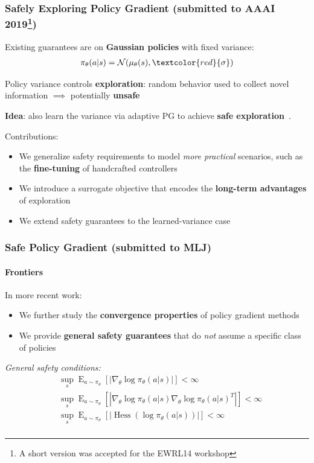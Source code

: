 \documentclass{beamer}
\begin{document}
\begin{frame}
\frametitle{Safely Exploring Policy Gradient \small(submitted to AAAI 2019\footnote{A short version was accepted for the EWRL14 workshop})}
Existing guarantees are on \textbf{Gaussian policies} with fixed variance:
\begin{align*}
	\pi_{\theta}(a \vert s) = \mathcal{N}(\mu_{\theta}(s), \textcolor{red}{\mathbf{\sigma}})
\end{align*}

Policy variance controls \textbf{exploration}: random behavior used to collect novel information $\implies$ potentially \textbf{unsafe}

\vfill

\textbf{Idea}: also learn the variance via adaptive PG to achieve \textbf{safe exploration}~\cite{amodei2016concrete}.

\vfill

\colorbox{cyan!10}{
\begin{minipage}{\textwidth}
Contributions:
\begin{itemize}
	\item We generalize safety requirements to model \textit{more practical} scenarios, such as the \textbf{fine-tuning} of handcrafted controllers
	\item We introduce a surrogate objective that encodes the \textbf{long-term advantages} of exploration
	\item We extend safety guarantees to the learned-variance case
\end{itemize}
\end{minipage}
}
\end{frame}


\begin{frame}
\frametitle{Safe Policy Gradient \small(submitted to MLJ)}
\framesubtitle{Frontiers}
\colorbox{cyan!10}{
	\begin{minipage}{\textwidth}
In more recent work:
\begin{itemize}
	\item We further study the \textbf{convergence properties} of policy gradient methods
	\item We provide \textbf{general safety guarantees} that do \textit{not} assume a specific class of policies
\end{itemize}
\end{minipage}
}

\vfill
	
\textit{General safety conditions:}
\begin{align*}
		&\sup_{s}\mathop{E}_{a\sim\pi_{\theta}}\left[\left|\nabla_{\theta}\log\pi_{\theta}(a\vert s)\right|\right] < \infty \\
		&\sup_{s}\mathop{E}_{a\sim\pi_{\theta}}\left[\left|\nabla_{\theta}\log\pi_{\theta}(a\vert s)\nabla_{\theta}\log\pi_{\theta}(a\vert s)^T\right|\right] < \infty \\
		&\sup_{s}\mathop{E}_{a\sim\pi_{\theta}}\left[\left|\mathop{Hess}\left(\log\pi_{\theta}(a\vert s)\right)\right|\right] < \infty \\
	\end{align*}
	
\end{frame}
\end{document}
